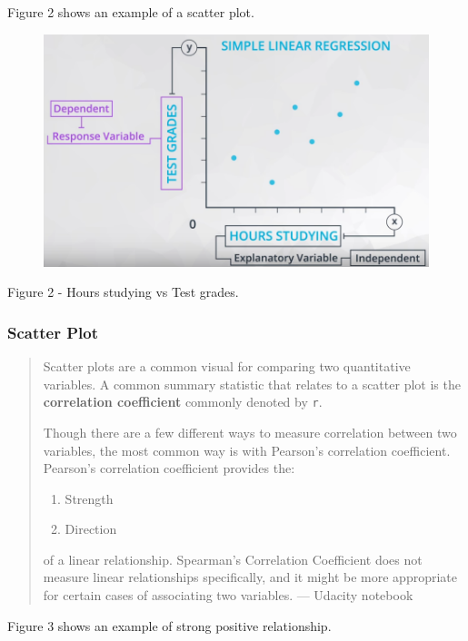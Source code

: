 \documentclass[]{book}
\providecommand{\tightlist}{%
  \setlength{\itemsep}{0pt}\setlength{\parskip}{0pt}}
\begin{document}
Figure 2 shows an example of a scatter plot.

\begin{figure}
\centering
\includegraphics{01-img/c4_l14_02.png}
\caption{}
\end{figure}

Figure 2 - Hours studying vs Test grades.

\subsubsection{Scatter Plot}\label{scatter-plot}

\begin{quote}
Scatter plots are a common visual for comparing two quantitative
variables. A common summary statistic that relates to a scatter plot is
the \textbf{correlation coefficient} commonly denoted by \texttt{r}.

Though there are a few different ways to measure correlation between two
variables, the most common way is with Pearson's correlation
coefficient. Pearson's correlation coefficient provides the:

\begin{enumerate}
\def\labelenumi{\arabic{enumi}.}
\tightlist
\item
  Strength
\item
  Direction
\end{enumerate}

of a linear relationship. Spearman's Correlation Coefficient does not
measure linear relationships specifically, and it might be more
appropriate for certain cases of associating two variables. --- Udacity
notebook
\end{quote}

Figure 3 shows an example of strong positive relationship.
\end{document}
